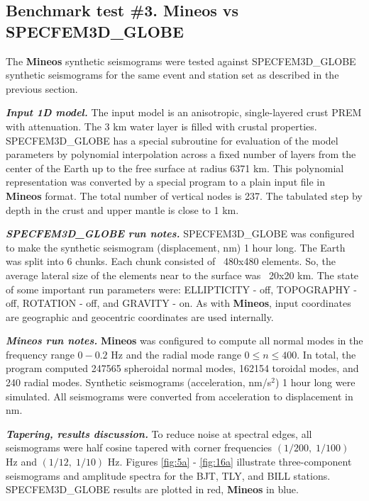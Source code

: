 \subsection{Benchmark test \#3. Mineos vs SPECFEM3D\_GLOBE}

The  {\bf Mineos} synthetic seismograms were tested against SPECFEM3D\_GLOBE
synthetic seismograms for the same event and station set as described in 
the previous section.

\noindent \textbf{\emph{Input 1D model.}} The input model is an anisotropic, 
single-layered crust
PREM with attenuation. The 3 km water layer is filled with crustal properties.
SPECFEM3D\_GLOBE has a special subroutine for evaluation of the model parameters by 
polynomial interpolation across a fixed number of layers from the center of
the Earth up to the free surface at radius 6371 km. This polynomial 
representation was converted by a special program to a plain input file in
{\bf Mineos} format. The total number of vertical nodes is 237. The tabulated
step by depth in the crust and upper mantle is close to 1 km.

\noindent \textbf{\emph{SPECFEM3D\_GLOBE run notes.}} SPECFEM3D\_GLOBE  was configured to make
the synthetic seismogram (displacement, nm) 1 hour long. The Earth was split
into 6 chunks. Each chunk consisted of ~480x480 elements.
So, the average lateral size of the elements near to the surface was ~20x20 km.
The state of some important run parameters were: ELLIPTICITY - off,
TOPOGRAPHY - off, ROTATION - off, and GRAVITY - on. As with {\bf Mineos}, input
coordinates are geographic and geocentric coordinates are used internally.

\noindent \textbf{\emph{Mineos run notes.}} {\bf Mineos} was configured to compute all normal modes
in the frequency range $0 - 0.2$ Hz and the radial mode range $0 \le n \le 400$. 
In total, the program computed 247565 spheroidal normal modes, 162154 toroidal modes, and 
240 radial modes. Synthetic seismograms (acceleration, nm/s$^2$) 1 hour long 
were simulated. All seismograms were converted from acceleration to 
displacement in nm.

\noindent \textbf{\emph{Tapering, results discussion.}} To reduce noise at 
spectral edges, all seismograms  were half cosine tapered with corner 
frequencies $(1/200,\; 1/100)$ Hz and $(1/12, \;1/10)$ Hz.
Figures \ref{fig:5a} - \ref{fig:16a} illustrate three-component seismograms and amplitude spectra
for the BJT, TLY, and BILL stations. SPECFEM3D\_GLOBE results are plotted 
in red, {\bf Mineos} in blue.

